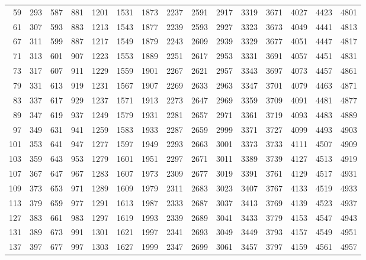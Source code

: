 \begin{tabular}{rrrrrrrrrrrrrrr}
   59 &   293 &   587 &   881 &  1201 &  1531 &  1873 &  2237 &  2591 &  2917 &  3319 &  3671 &  4027 &  4423 &  4801 \\
   61 &   307 &   593 &   883 &  1213 &  1543 &  1877 &  2239 &  2593 &  2927 &  3323 &  3673 &  4049 &  4441 &  4813 \\
   67 &   311 &   599 &   887 &  1217 &  1549 &  1879 &  2243 &  2609 &  2939 &  3329 &  3677 &  4051 &  4447 &  4817 \\
   71 &   313 &   601 &   907 &  1223 &  1553 &  1889 &  2251 &  2617 &  2953 &  3331 &  3691 &  4057 &  4451 &  4831 \\
   73 &   317 &   607 &   911 &  1229 &  1559 &  1901 &  2267 &  2621 &  2957 &  3343 &  3697 &  4073 &  4457 &  4861 \\
   79 &   331 &   613 &   919 &  1231 &  1567 &  1907 &  2269 &  2633 &  2963 &  3347 &  3701 &  4079 &  4463 &  4871 \\
   83 &   337 &   617 &   929 &  1237 &  1571 &  1913 &  2273 &  2647 &  2969 &  3359 &  3709 &  4091 &  4481 &  4877 \\
   89 &   347 &   619 &   937 &  1249 &  1579 &  1931 &  2281 &  2657 &  2971 &  3361 &  3719 &  4093 &  4483 &  4889 \\
   97 &   349 &   631 &   941 &  1259 &  1583 &  1933 &  2287 &  2659 &  2999 &  3371 &  3727 &  4099 &  4493 &  4903 \\
  101 &   353 &   641 &   947 &  1277 &  1597 &  1949 &  2293 &  2663 &  3001 &  3373 &  3733 &  4111 &  4507 &  4909 \\
  103 &   359 &   643 &   953 &  1279 &  1601 &  1951 &  2297 &  2671 &  3011 &  3389 &  3739 &  4127 &  4513 &  4919 \\
  107 &   367 &   647 &   967 &  1283 &  1607 &  1973 &  2309 &  2677 &  3019 &  3391 &  3761 &  4129 &  4517 &  4931 \\
  109 &   373 &   653 &   971 &  1289 &  1609 &  1979 &  2311 &  2683 &  3023 &  3407 &  3767 &  4133 &  4519 &  4933 \\
  113 &   379 &   659 &   977 &  1291 &  1613 &  1987 &  2333 &  2687 &  3037 &  3413 &  3769 &  4139 &  4523 &  4937 \\
  127 &   383 &   661 &   983 &  1297 &  1619 &  1993 &  2339 &  2689 &  3041 &  3433 &  3779 &  4153 &  4547 &  4943 \\
  131 &   389 &   673 &   991 &  1301 &  1621 &  1997 &  2341 &  2693 &  3049 &  3449 &  3793 &  4157 &  4549 &  4951 \\
  137 &   397 &   677 &   997 &  1303 &  1627 &  1999 &  2347 &  2699 &  3061 &  3457 &  3797 &  4159 &  4561 &  4957 \\

\end{tabular}
